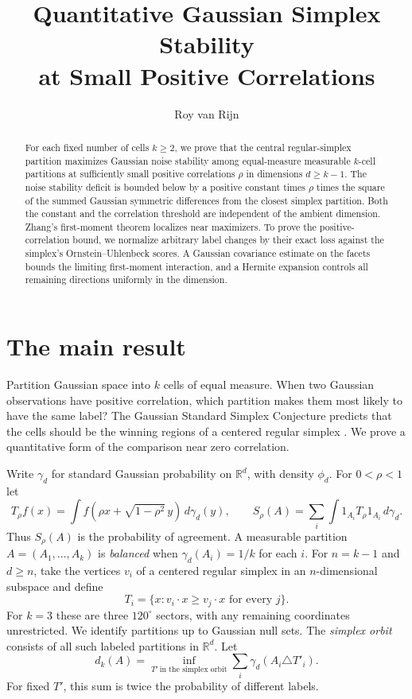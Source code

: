 \documentclass[11pt,reqno]{amsart}
\title[Gaussian simplex stability at small correlations]{Quantitative Gaussian Simplex Stability\\at Small Positive Correlations}
\author{Roy van Rijn}
\date{}
\newcommand{\R}{\mathbb R}
\newcommand{\ga}{\gamma}
\begin{document}
\begin{abstract}
For each fixed number of cells $k\ge2$, we prove that the central
regular-simplex partition maximizes Gaussian noise stability among
equal-measure measurable $k$-cell partitions at sufficiently small
positive correlations $\rho$ in dimensions $d\ge k-1$. The noise stability deficit is bounded below
by a positive constant times $\rho$ times the square of the summed Gaussian
symmetric differences from the closest simplex partition. Both the constant and
the correlation threshold are independent of the ambient dimension.
Zhang's first-moment theorem localizes near maximizers. To prove the
positive-correlation bound, we normalize arbitrary label changes by their
exact loss against the simplex's Ornstein--Uhlenbeck scores. A Gaussian
covariance estimate on the facets bounds the limiting first-moment
interaction, and a Hermite expansion controls all remaining directions
uniformly in the dimension.
\end{abstract}
\maketitle

\section{The main result}

Partition Gaussian space into $k$ cells of equal measure. When two
Gaussian observations have positive correlation, which partition makes
them most likely to have the same label? The Gaussian Standard Simplex
Conjecture predicts that the cells should be the winning regions of a
centered regular simplex \cite[Conjecture~1.4(i)]{IM}. We prove a
quantitative form of the comparison near zero correlation.

Write $\ga_d$ for standard Gaussian probability on $\R^d$, with density
$\phi_d$. For $0<\rho<1$ let
\[
 T_\rho f(x)=\int f(\rho x+\sqrt{1-\rho^2}\,y)\,d\ga_d(y),
 \qquad S_\rho(A)=\sum_i\int 1_{A_i}T_\rho1_{A_i}\,d\ga_d.
\]
Thus $S_\rho(A)$ is the probability of agreement. A measurable partition
$A=(A_1,\ldots,A_k)$ is \emph{balanced} when $\ga_d(A_i)=1/k$ for each
$i$. For $n=k-1$ and $d\ge n$, take the vertices $v_i$ of a centered
regular simplex in an $n$-dimensional subspace and define
\[
 T_i=\{x:v_i\cdot x\ge v_j\cdot x\text{ for every }j\}.
\]
For $k=3$ these are three $120^\circ$ sectors, with any remaining
coordinates unrestricted. We identify partitions up to Gaussian null
sets. The \emph{simplex orbit} consists of all such labeled partitions
in $\R^d$. Let
\[
 d_k(A)=\inf_{T'\ \text{in the simplex orbit}}
             \sum_i\ga_d(A_i\triangle T'_i).
\]
For fixed $T'$, this sum is twice the probability of different labels.
\end{document}
